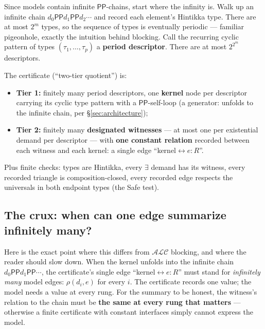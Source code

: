 \documentclass[11pt]{article}
\newcommand{\PP}{\ensuremath{\mathsf{PP}}}
\begin{document}
Since models contain infinite $\PP$-chains, start where the infinity
is. Walk up an infinite chain $d_0\mathbin{\PP}d_1\mathbin{\PP}d_2\cdots$
and record each element's Hintikka type. There are at most $2^m$ types,
so the sequence of types is eventually periodic --- familiar
pigeonhole, exactly the intuition behind blocking. Call the recurring
cyclic pattern of types $(\tau_1,\dots,\tau_p)$ a \textbf{period
descriptor}. There are at most $2^{2^m}$ descriptors.

The certificate (``two-tier quotient'') is:
\begin{itemize}
\item \textbf{Tier 1:} finitely many period descriptors, one
  \textbf{kernel} node per descriptor carrying its cyclic type pattern
  with a $\PP$-self-loop (a generator: unfolds to the infinite chain,
  per \S\ref{sec:architecture});
\item \textbf{Tier 2:} finitely many \textbf{designated witnesses} ---
  at most one per existential demand per descriptor --- with
  \textbf{one constant relation} recorded between each witness and each
  kernel: a single edge ``kernel${}\leftrightarrow e:R$''.
\end{itemize}
Plus finite checks: types are Hintikka, every $\exists$ demand has its
witness, every recorded triangle is composition-closed, every recorded
edge respects the universals in both endpoint types (the Safe test).

\subsection{The crux: when can one edge summarize infinitely
many?}\label{ssec:crux}

Here is the exact point where this differs from $\mathcal{ALC}$
blocking, and where the reader should slow down. When the kernel
unfolds into the infinite chain $d_0\mathbin{\PP}d_1\mathbin{\PP}\cdots$,
the certificate's single edge ``kernel${}\leftrightarrow e:R$'' must
stand for \emph{infinitely many} model edges: $\rho(d_i,e)$ for every
$i$. The certificate records one value; the model needs a value at
every rung. For the summary to be honest, the witness's relation to the
chain must be \textbf{the same at every rung that matters} ---
otherwise a finite certificate with constant interfaces simply cannot
express the model.
\end{document}
